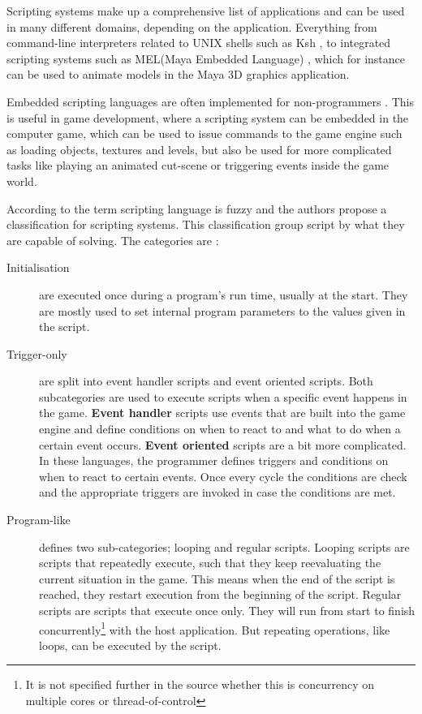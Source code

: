 Scripting systems make up a comprehensive list of applications and can be used in many different domains, depending on the application. Everything from command-line interpreters related to UNIX shells such as Ksh \cite{korn1994ksh}, to integrated scripting systems such as MEL(Maya Embedded Language) \cite{gould2003complete}, which for instance can be used to animate models in the Maya 3D graphics application.

Embedded scripting languages are often implemented for non-programmers \cite{gamedev:lua}. This is useful in game development, where a scripting system can be embedded in the computer game, which can be used to issue commands to the game engine such as loading objects, textures and levels, but also be used for more complicated tasks like playing an animated cut-scene or triggering events inside the game world. 

According to \cite{5962102} the term scripting language is fuzzy and the authors propose a classification for scripting systems. This classification group script by what they are capable of solving. The categories are \cite{5962102}:
\begin{description}
    \item[Initialisation] are executed once during a program's run time, usually at the start. They are mostly used to set internal program parameters to the values given in the script.
    \item[Trigger-only] are split into event handler scripts and event oriented scripts. Both subcategories are used to execute scripts when a specific event happens in the game. \textbf{Event handler} scripts use events that are built into the game engine and define conditions on when to react to and what to do when a certain event occurs. \textbf{Event oriented} scripts are a bit more complicated. In these languages, the programmer defines triggers and conditions on when to react to certain events. Once every cycle the conditions are check and the appropriate triggers are invoked in case the conditions are met.
    \item[Program-like] defines two sub-categories; looping and regular scripts. Looping scripts are scripts that repeatedly execute, such that they keep reevaluating the current situation in the game. This means when the end of the script is reached, they restart execution from the beginning of the script. Regular scripts are scripts that execute once only. They will run from start to finish concurrently\footnote{It is not specified further in the source whether this is concurrency on multiple cores or thread-of-control} with the host application. But repeating operations, like loops, can be executed by the script.
\end{description}

